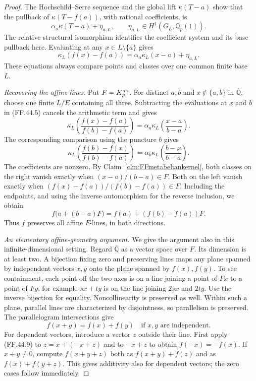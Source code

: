 \begin{proof}
The Hochschild--Serre sequence and
the global lift \(\kappa(T-a)\)
show that the pullback of
\(\kappa(T-f(a))\), with rational
coefficients, is
\[
                         \alpha_a\kappa(T-a)+\eta_{a,L},
           \qquad \eta_{a,L}\in H^1(G_L,\mathbb Q_p(1)).
                                                        \tag{FF.44.4}
\]
The relative structural isomorphism
identifies the coefficient system
and its base pullback here. Evaluating
at any \(x\in L\setminus\{a\}\)
gives
\[
       \kappa_L(f(x)-f(a))
          =\alpha_a\kappa_L(x-a)+\eta_{a,L}.
                                                        \tag{FF.44.5}
\]
These equations always compare points
and classes over one common finite
base \(L\).

\emph{Recovering the affine lines.}
Put \(F=K_p^{\rm ab}\). For distinct
\(a,b\) and \(x\notin\{a,b\}\)
in \(\overline{\mathbb Q}\), choose
one finite \(L/E\) containing all
three. Subtracting the evaluations
at \(x\) and \(b\) in (FF.44.5)
cancels the arithmetic term and gives
\[
 \kappa_L\!\left(\frac{f(x)-f(a)}{f(b)-f(a)}\right)
     =\alpha_a
          \kappa_L\!\left(\frac{x-a}{b-a}\right).
                                                        \tag{FF.44.6}
\]
The corresponding comparison using
the puncture \(b\) gives
\[
 \kappa_L\!\left(\frac{f(b)-f(x)}{f(b)-f(a)}\right)
     =\alpha_b
          \kappa_L\!\left(\frac{b-x}{b-a}\right).
                                                        \tag{FF.44.7}
\]
The coefficients are nonzero. By
Claim~\ref{clm:FFmetabeliankernel},
both classes on the right vanish
exactly when \((x-a)/(b-a)\in F\).
Both on the left vanish exactly
when \((f(x)-f(a))/(f(b)-f(a))\in F\).
Including the endpoints, and using
the inverse automorphism for the
reverse inclusion, we obtain
\[
                 f\bigl(a+(b-a)F\bigr)
                     =f(a)+(f(b)-f(a))F.
                                                        \tag{FF.44.8}
\]
Thus \(f\) preserves all affine
\(F\)-lines, in both directions.

\emph{An elementary affine-geometry argument.}
We give the argument also in this
infinite-dimensional setting. Regard
\(\overline{\mathbb Q}\) as a vector
space over \(F\). Its dimension
is at least two. A bijection fixing
zero and preserving lines maps any
plane spanned by independent vectors
\(x,y\) onto the plane spanned by
\(f(x),f(y)\). To see containment,
each point off the two axes is on
a line joining a point of \(Fx\)
to a point of \(Fy\); for example
\(sx+ty\) is on the line joining
\(2sx\) and \(2ty\). Use the
inverse bijection for equality.
Noncollinearity is preserved as well.
Within such a plane, parallel lines
are characterized by disjointness,
so parallelism is preserved.
The parallelogram intersections give
\[
                      f(x+y)=f(x)+f(y)
                   \quad\text{if }x,y\text{ are independent.}
                                                        \tag{FF.44.9}
\]
For dependent vectors, introduce a
vector \(z\) outside their line.
First apply (FF.44.9) to
\(z=x+(-x+z)\) and to \(-x+z\)
to obtain \(f(-x)=-f(x)\).
If \(x+y\ne0\), compute
\(f(x+y+z)\) both as
\(f(x+y)+f(z)\) and as
\(f(x)+f(y+z)\). This gives
additivity also for dependent vectors;
the zero cases follow immediately.


\end{proof}

